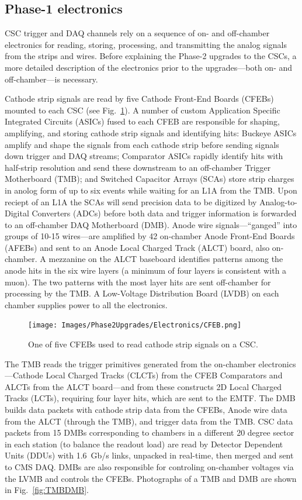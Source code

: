 \subsection{Phase-1 electronics} \label{sec:Phase1CSCelectronics}

CSC trigger and DAQ channels rely on a sequence of on- and off-chamber electronics for reading, storing, processing, and transmitting the analog signals from the strips and wires. Before explaining the Phase-2 upgrades to the CSCs, a more detailed description of the electronics prior to the upgrades---both on- and off-chamber---is necessary. 

Cathode strip signals are read by five Cathode Front-End Boards (CFEBs) mounted to each CSC (see Fig.~\ref{fig:CFEB}). A number of custom Application Specific Integrated Circuits (ASICs) fused to each CFEB are responsible for shaping, amplifying, and storing cathode strip signals and identifying hits: Buckeye ASICs amplify and shape the signals from each cathode strip before sending signals down trigger and DAQ streams; Comparator ASICs rapidly identify hits with half-strip resolution and send these downstream to an off-chamber Trigger Motherboard (TMB); and Switched Capacitor Arrays (SCAs) store strip charges in anolog form of up to six events while waiting for an L1A from the TMB. Upon reciept of an L1A the SCAs will send precision data to be digitized by Analog-to-Digital Converters (ADCs) before both data and trigger information is forwarded to an off-chamber DAQ Motherboard (DMB). Anode wire signals---``ganged'' into groups of 10-15 wires---are amplified by 42 on-chamber Anode Front-End Boards (AFEBs) and sent to an Anode Local Charged Track (ALCT) board, also on-chamber. A mezzanine on the ALCT baseboard identifies patterns among the anode hits in the six wire layers (a minimum of four layers is consistent with a muon). The two patterns with the most layer hits are sent off-chamber for processing by the TMB. A Low-Voltage Distribution Board (LVDB) on each chamber supplies power to all the electronics.

\begin{figure}[H]
    \centering
    \texttt{[image: Images/Phase2Upgrades/Electronics/CFEB.png]}
    \caption{One of five CFEBs used to read cathode strip signals on a CSC.}
    \label{fig:CFEB}
\end{figure}

The TMB reads the trigger primitives generated from the on-chamber electronics---Cathode Local Charged Tracks (CLCTs) from the CFEB Comparators and ALCTs from the ALCT board---and from these constructs 2D Local Charged Tracks (LCTs), requiring four layer hits, which are sent to the EMTF. The DMB builds data packets with cathode strip data from the CFEBs, Anode wire data from the ALCT (through the TMB), and trigger data from the TMB. CSC data packets from 15 DMBs corresponding to chambers in a different 20 degree sector in each station (to balance the readout load) are read by Detector Dependent Units (DDUs) with \SI{1.6}{Gb/s} links, unpacked in real-time, then merged and sent to CMS DAQ. DMBs are also responsible for controling on-chamber voltages via the LVMB and controls the CFEBs. Photographs of a TMB and DMB are shown in Fig.~\ref{fig:TMBDMB}.

